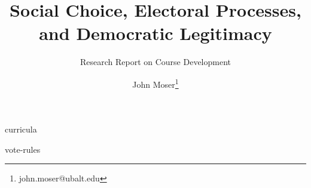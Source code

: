 \documentclass[twoside,titlepage,12pt,appendixprefix=true]{scrreprt}
\begin{document}
    \author{John Moser\thanks{john.moser@ubalt.edu}}

    \title{Social Choice, Electoral Processes, and Democratic Legitimacy}
    \subtitle{Research Report on Course Development}
    \maketitle
    \addtocounter{page}{-1}
    \tableofcontents
    \clearpage
    
    
    {curricula}
    \appendix
    
    
    {vote-rules}
    
    \printbibliography

    
\end{document}
